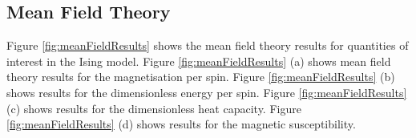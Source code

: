 \documentclass[11pt]{iopart}
\begin{document}
\subsection{Mean Field Theory}

Figure \ref{fig:meanFieldResults} shows the mean field theory results for quantities of interest in the Ising model. Figure \ref{fig:meanFieldResults} (a) shows mean field theory results for the magnetisation per spin. Figure \ref{fig:meanFieldResults} (b) shows results for the dimensionless energy per spin. Figure \ref{fig:meanFieldResults} (c) shows results for the dimensionless heat capacity. Figure \ref{fig:meanFieldResults} (d) shows results for the magnetic susceptibility.

\begin{figure}[t]
    \centering
    \quad
     \\
     \quad

\end{figure}
\end{document}
